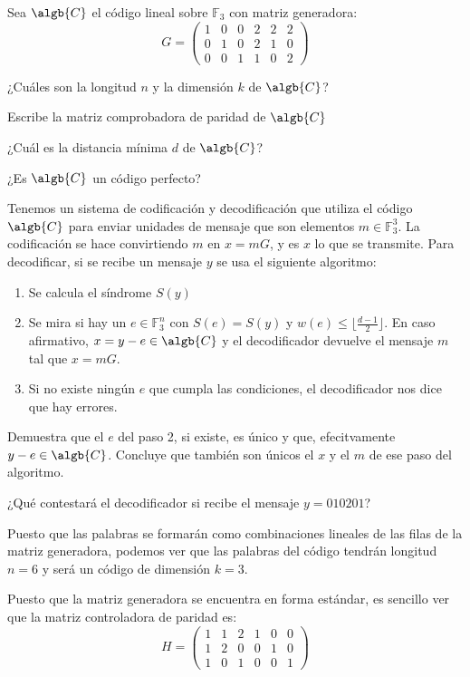 \begin{problem}[2]
Sea $\algb{C}$ el código lineal sobre $\mathbb{F}_3$ con matriz generadora:
\[G = \left(\begin{array}{cccccc}
1 & 0 & 0 & 2 & 2 & 2 \\
0 & 1 & 0 & 2 & 1 & 0 \\
0 & 0 & 1 & 1 & 0 & 2
\end{array} \right)\]

\ppart ¿Cuáles son la longitud $n$ y la dimensión $k$ de $\algb{C}$?

\ppart Escribe la matriz comprobadora de paridad de $\algb{C}$

\ppart ¿Cuál es la distancia mínima $d$ de $\algb{C}$?

\ppart ¿Es $\algb{C}$ un código perfecto?

Tenemos un sistema de codificación y decodificación que utiliza el código $\algb{C}$ para enviar unidades de mensaje que son elementos $m \in \mathbb{F}_3^3$. La codificación se hace convirtiendo $m$ en $x=mG$, y es $x$ lo que se transmite. Para decodificar, si se recibe un mensaje $y$ se usa el siguiente algoritmo:

\begin{enumerate}
\item Se calcula el síndrome $S(y)$
\item Se mira si hay un $e \in \mathbb{F}_3^n$ con $S(e)=S(y)$ y $w(e)\leq \lfloor \frac{d-1}{2}\rfloor$. En caso afirmativo, $x=y-e \in \algb{C}$ y el decodificador devuelve el mensaje $m$ tal que $x=mG$.
\item Si no existe ningún $e$ que cumpla las condiciones, el decodificador nos dice que hay errores.
\end{enumerate}

\ppart Demuestra que el $e$ del paso 2, si existe, es único y que, efecitvamente $y-e \in \algb{C}$. Concluye que también son únicos el $x$ y el $m$ de ese paso del algoritmo.

\ppart ¿Qué contestará el decodificador si recibe el mensaje $y=010201$?
\solution

\spart

Puesto que las palabras se formarán como combinaciones lineales de las filas de la matriz generadora, podemos ver que las palabras del código tendrán longitud $n=6$ y será un código de dimensión $k=3$.

\spart

Puesto que la matriz generadora se encuentra en forma estándar, es sencillo ver que la matriz controladora de paridad es:
\[H = \left(\begin{array}{cccccc}
1 & 1 & 2 & 1 & 0 & 0 \\
1 & 2 & 0 & 0 & 1 & 0 \\
1 & 0 & 1 & 0 & 0 & 1
\end{array} \right)\]


\end{problem}
